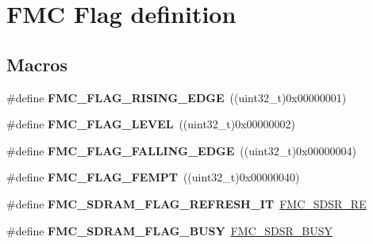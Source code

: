 \hypertarget{group___f_m_c___l_l___flag__definition}{}\section{F\+MC Flag definition}
\label{group___f_m_c___l_l___flag__definition}
\subsection*{Macros}
\begin{DoxyCompactItemize}
\item 
\#define {\bfseries F\+M\+C\+\_\+\+F\+L\+A\+G\+\_\+\+R\+I\+S\+I\+N\+G\+\_\+\+E\+D\+GE}~((uint32\+\_\+t)0x00000001)\hypertarget{group___f_m_c___l_l___flag__definition_ga697cdef648bd297ceb4d0f381661f9b0}{}\label{group___f_m_c___l_l___flag__definition_ga697cdef648bd297ceb4d0f381661f9b0}

\item 
\#define {\bfseries F\+M\+C\+\_\+\+F\+L\+A\+G\+\_\+\+L\+E\+V\+EL}~((uint32\+\_\+t)0x00000002)\hypertarget{group___f_m_c___l_l___flag__definition_gab2638c082cb1f005a12aaac211c2bca3}{}\label{group___f_m_c___l_l___flag__definition_gab2638c082cb1f005a12aaac211c2bca3}

\item 
\#define {\bfseries F\+M\+C\+\_\+\+F\+L\+A\+G\+\_\+\+F\+A\+L\+L\+I\+N\+G\+\_\+\+E\+D\+GE}~((uint32\+\_\+t)0x00000004)\hypertarget{group___f_m_c___l_l___flag__definition_gadade0d8bc3889dee0e5cdb5c35ccb46c}{}\label{group___f_m_c___l_l___flag__definition_gadade0d8bc3889dee0e5cdb5c35ccb46c}

\item 
\#define {\bfseries F\+M\+C\+\_\+\+F\+L\+A\+G\+\_\+\+F\+E\+M\+PT}~((uint32\+\_\+t)0x00000040)\hypertarget{group___f_m_c___l_l___flag__definition_gaea0e27112081804b8a00a6d1d51e3787}{}\label{group___f_m_c___l_l___flag__definition_gaea0e27112081804b8a00a6d1d51e3787}

\item 
\#define {\bfseries F\+M\+C\+\_\+\+S\+D\+R\+A\+M\+\_\+\+F\+L\+A\+G\+\_\+\+R\+E\+F\+R\+E\+S\+H\+\_\+\+IT}~\hyperlink{group___peripheral___registers___bits___definition_ga6122b8dc3cac5ac09342b843b36ae36d}{F\+M\+C\+\_\+\+S\+D\+S\+R\+\_\+\+RE}\hypertarget{group___f_m_c___l_l___flag__definition_ga38dced18d685dc07368db56c22fd25a7}{}\label{group___f_m_c___l_l___flag__definition_ga38dced18d685dc07368db56c22fd25a7}

\item 
\#define {\bfseries F\+M\+C\+\_\+\+S\+D\+R\+A\+M\+\_\+\+F\+L\+A\+G\+\_\+\+B\+U\+SY}~\hyperlink{group___peripheral___registers___bits___definition_ga4a1fac2c6ca51889b974cae07f51839b}{F\+M\+C\+\_\+\+S\+D\+S\+R\+\_\+\+B\+U\+SY}\hypertarget{group___f_m_c___l_l___flag__definition_gaad4d11c914b1d4ac4190cab2a88cab3d}{}\label{group___f_m_c___l_l___flag__definition_gaad4d11c914b1d4ac4190cab2a88cab3d}


\end{DoxyCompactItemize}
